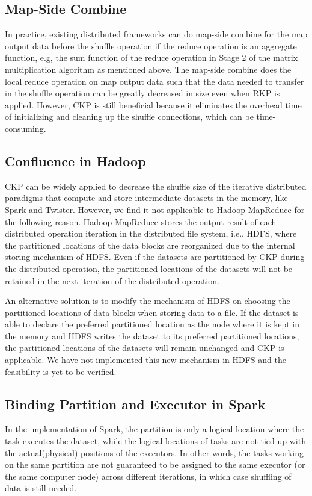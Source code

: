 \documentclass[10pt,journal,compsoc]{IEEEtran}
\begin{document}
\subsection{Map-Side Combine}
In practice, existing distributed frameworks can do map-side
combine for the map output data before the shuffle operation if the
reduce operation is an aggregate function, e.g, the sum function of the
reduce operation in Stage 2 of the matrix multiplication algorithm as
mentioned above.
The map-side combine does the local reduce operation on map output data
such that the data needed to transfer in the shuffle operation can be
greatly decreased in size even when RKP is applied.
However, CKP is still beneficial because it eliminates the overhead time
of initializing and cleaning up the %
shuffle connections, which can be time-consuming.


\subsection{Confluence in Hadoop}
CKP can be widely applied to decrease the shuffle size of the iterative
distributed paradigms that compute and store intermediate datasets in
the memory, like Spark and Twister.
However, we find it not applicable to Hadoop MapReduce for the following reason. 
Hadoop MapReduce stores the output result of each distributed operation
iteration in the distributed file system, i.e., HDFS,
where the partitioned locations of the data blocks are reorganized due to the internal storing mechanism of HDFS.
Even if the datasets are partitioned by CKP during the distributed
operation, the partitioned locations of the datasets will not be
retained in the next iteration of the distributed operation.

An alternative solution is to modify the mechanism of HDFS on choosing the
partitioned locations of data blocks when storing data to a file.
If the dataset is able to declare the preferred partitioned location as the node where it is kept in the memory and HDFS writes the dataset to its preferred partitioned locations, the partitioned locations of the datasets will remain unchanged and CKP is applicable. 
We have not implemented this new mechanism in HDFS and the feasibility is yet to be verified. 


\subsection{Binding Partition and Executor in Spark}
In the implementation of Spark, the partition is only a logical location where the task executes the dataset, while the logical locations of tasks are not tied up with the actual(physical) positions of the executors. 
In other words, %
the tasks working on the same partition are not guaranteed to be assigned to the same executor (or the same computer node) across different iterations, in which case shuffling of data is still needed. 
\end{document}
